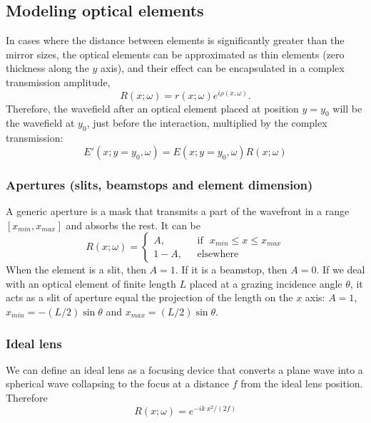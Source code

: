 \documentclass{iucr}
\begin{document}
\subsection{Modeling optical elements}
\label{sec:elements}

In cases where the distance between elements is significantly greater than the mirror sizes, the optical elements can be approximated as thin elements (zero thickness along the $y$ axis), and their effect can be encapsulated in a complex transmission amplitude,
\begin{equation}
    \label{eq:thinelement}
    R(x;\omega)=r(x;\omega) e^{i \rho(x,\omega)}.
\end{equation}
Therefore, the wavefield after an optical element placed at position $y=y_0$ will be the wavefield at $y_0$, just before the interaction, multiplied by the complex transmission:
\begin{equation}
    E'(x;y=y_0,\omega) = E(x;y=y_0,\omega) R(x;\omega)
\end{equation}


\subsubsection{Apertures (slits, beamstops and element dimension)}
\label{sec:aperture}

A generic aperture is a mask that transmits a part of the wavefront in a range $[x_{min},x_{max}]$ and absorbs the rest. It can be
\begin{equation}
R(x;\omega) =
\left\{
\begin{matrix}
A,  & \mbox{~~if~~} x_{min} \le x \le x_{max}
\\ 
1 - A, & \mbox{~~elsewhere}
\end{matrix}
\right.
\end{equation}
When the element is a slit, then $A=1$. If it is a beamstop, then $A=0$. If we deal with an optical element of finite length $L$ placed at a grazing incidence angle $\theta$, it acts as a slit of aperture equal the projection of the length on the $x$ axis: $A=1$, $x_{min}=-(L/2) \sin \theta$ and $x_{max}=(L/2) \sin \theta$. 

\subsubsection{Ideal lens}
\label{sec:idealLens}

We can define an ideal lens as a focusing device that converts a plane wave into a spherical wave collapsing to the focus at a distance $f$ from the ideal lens position. Therefore
\begin{equation}
    R(x;\omega) = e^{-i k~x^2/(2 f)}
\end{equation}
\end{document}
